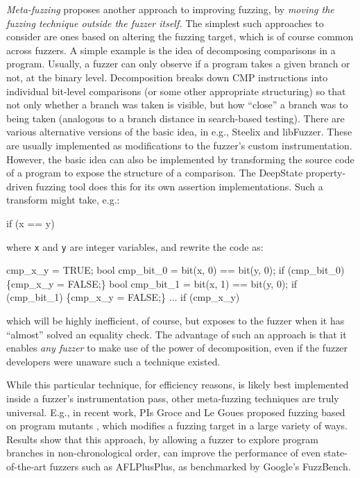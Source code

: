 \documentclass[numbers]{proposalnsf}
\begin{document}
\emph{Meta-fuzzing} proposes another approach to improving fuzzing, by \emph{moving the fuzzing technique outside the fuzzer itself.}  The simplest such approaches to consider are ones based on altering the fuzzing target, which is of course common across fuzzers.  A simple example is the idea of decomposing comparisons in a program.  Usually, a fuzzer can only observe if a program takes a given branch or not, at the binary level.  Decomposition breaks down CMP instructions into individual bit-level comparisons (or some other appropriate structuring) so that not only whether a branch was taken is visible, but how ``close'' a branch was to being taken (analogous to a branch distance in search-based testing).  There are various alternative versions of the basic idea, in e.g., Steelix and libFuzzer.  These are usually implemented as modifications to the fuzzer's custom instrumentation.  However, the basic idea can also be implemented by transforming the source code of a program to expose the structure of a comparison.  The DeepState property-driven fuzzing tool does this for its own assertion implementations.  Such a transform might take, e.g.:

\begin{code}

if (x == y)
\end{code}

\noindent where {\tt x} and {\tt y} are integer variables, and rewrite the code as:

\begin{code}
cmp\_x\_y = TRUE;
bool cmp\_bit\_0 = bit(x, 0) == bit(y, 0);
if (cmp\_bit\_0) \{cmp\_x\_y = FALSE;\}
bool cmp\_bit\_1 = bit(x, 1) == bit(y, 0);
if (cmp\_bit\_1) \{cmp\_x\_y = FALSE;\}
$\ldots$
if (cmp\_x\_y)
\end{code}

\noindent which will be highly inefficient, of course, but exposes to the fuzzer when it has ``almost'' solved an equality check.  The advantage of such an approach is that it enables \emph{any fuzzer} to make use of the power of decomposition, even if the fuzzer developers were unaware such a technique existed.

While this particular technique, for efficiency reasons, is likely best implemented inside a fuzzer's instrumentation pass, other meta-fuzzing techniques are truly universal.  E.g., in recent work, PIs Groce and Le Goues proposed fuzzing based on program mutants \cite{}, which modifies a fuzzing target in a large variety of ways.  Results show that this approach, by allowing a fuzzer to explore program branches in non-chronological order, can improve the performance of even state-of-the-art fuzzers such as AFLPlusPlus, as benchmarked by Google's FuzzBench.
  
\end{document}
